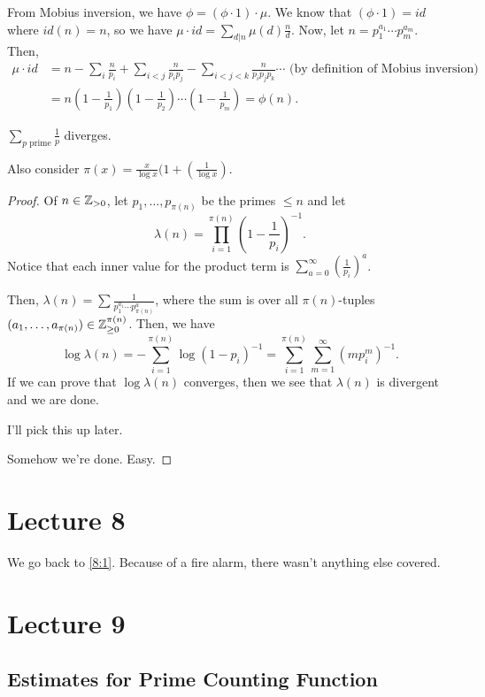 \documentclass{article}
\begin{document}
From Mobius inversion, we have $\phi = (\phi \cdot 1) \cdot \mu$. We know that $(\phi \cdot 1) = id$ where $id(n) = n$, so we have $\mu \cdot id = \sum_{d | n} \mu(d) \frac{n}{d}$. Now, let $n = p_1^{a_1}\cdots p_m^{a_m}$.  Then,
\begin{align*}
    \mu \cdot id &= n - \sum_{i} \frac{n}{p_i} + \sum_{i < j} \frac{n}{p_ip_j} - \sum_{i < j < k} \frac{n}{p_ip_jp_k} \cdots \text{ (by definition of Mobius inversion)}\\
    &= n\left(1 - \frac{1}{p_1}\right)\left(1 - \frac{1}{p_2}\right)\cdots \left(1 - \frac{1}{p_m}\right) = \phi(n).
\end{align*}

\begin{theorem}
    \label{8:1}
    $\sum_{p \text{ prime}} \frac{1}{p}$ diverges.
\end{theorem}

Also consider $\pi(x) = \frac{x}{\log x}(1 + \left(\frac{1}{\log x}\right)$.

\begin{proof}
    Of $n \in \mathbb Z_{> 0}$, let $p_1, \ldots, p_{\pi(n)}$ be the primes $\leq n$ and let \[\lambda(n) = \prod_{i = 1}^{\pi(n)} \left(1 - \frac{1}{p_i}\right)^{-1}.\] Notice that each inner value for the product term is $\sum_{a = 0}^\infty \left(\frac{1}{p_i}\right)^a$. 

    Then, $\lambda(n) = \sum \frac{1}{p_1^{a_1} \cdots p_{\pi(n)}^a}$, where the sum is over all $\pi(n)$-tuples $(a_1, \ldots, a_{\pi(n)}) \in \mathbb Z_{\geq 0}^{\pi(n)}$. Then, we have \[\log \lambda(n) = -\sum_{i = 1}^{\pi(n)} \log(1 - p_i)^{-1} = \sum_{i = 1}^{\pi(n)} \sum_{m = 1}^\infty (mp_i^m)^{-1}.\] If we can prove that $\log \lambda(n)$ converges, then we see that $\lambda(n)$ is divergent and we are done. 

    I'll pick this up later.

    Somehow we're done. Easy.
\end{proof}

\section{Lecture 8}
We go back to \ref{8:1}. Because of a fire alarm, there wasn't anything else covered.

\section{Lecture 9}
\subsection{Estimates for Prime Counting Function}
\end{document}
